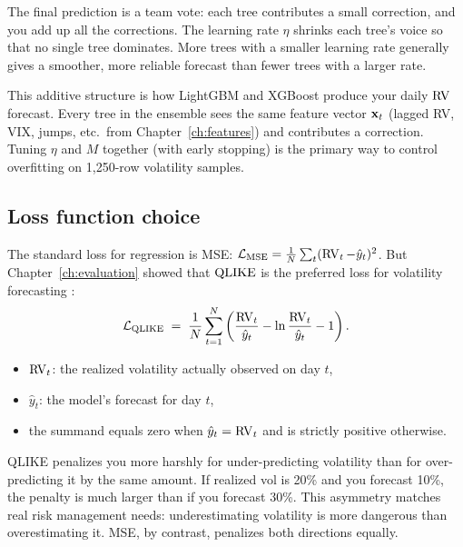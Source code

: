 \begin{intuition}
The final prediction is a team vote: each tree contributes a small correction,
and you add up all the corrections.  The learning rate $\eta$ shrinks each
tree's voice so that no single tree dominates.  More trees with a smaller
learning rate generally gives a smoother, more reliable forecast than fewer
trees with a larger rate.
\end{intuition}

\begin{projectconnection}
This additive structure is how LightGBM and XGBoost produce your daily
$\operatorname{RV}$ forecast.  Every tree in the ensemble sees the same feature vector
$\mathbf{x}_t$ (lagged RV, VIX, jumps, etc.\ from Chapter~\ref{ch:features})
and contributes a correction.  Tuning $\eta$ and $M$ together (with early
stopping) is the primary way to control overfitting on 1,250-row
volatility samples.
\end{projectconnection}

\subsection*{Loss function choice}

The standard loss for regression is MSE:
$\mathcal{L}_{\text{MSE}} = \frac{1}{N}\sum_t (\operatorname{RV}_t - \hat{y}_t)^2$.
But Chapter~\ref{ch:evaluation} showed that $\operatorname{QLIKE}$ is the preferred loss
for volatility forecasting \citep{AudrinoKnaus2016}:
\begin{equation}\label{eq:trees:qlike}
  \mathcal{L}_{\operatorname{QLIKE}} \;=\; \frac{1}{N}\sum_{t=1}^{N}
  \left(\frac{\operatorname{RV}_t}{\hat{y}_t} - \ln\frac{\operatorname{RV}_t}{\hat{y}_t} - 1\right).
\end{equation}
\begin{itemize}[nosep]
  \item $\operatorname{RV}_t$: the realized volatility actually observed on day $t$,
  \item $\hat{y}_t$: the model's forecast for day $t$,
  \item the summand equals zero when $\hat{y}_t = \operatorname{RV}_t$ and is strictly
        positive otherwise.
\end{itemize}

\begin{intuition}
QLIKE penalizes you more harshly for under-predicting volatility than for
over-predicting it by the same amount.  If realized vol is 20\% and you
forecast 10\%, the penalty is much larger than if you forecast 30\%.  This
asymmetry matches real risk management needs: underestimating volatility is
more dangerous than overestimating it.  MSE, by contrast, penalizes both
directions equally.
\end{intuition}

